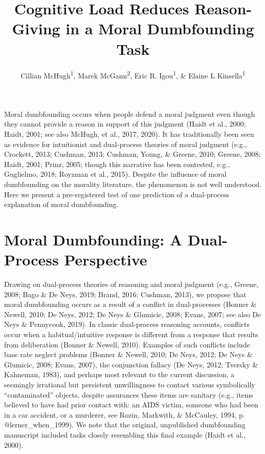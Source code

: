 \documentclass[
  american,
  man,floatsintext]{apa7}
\title{Cognitive Load Reduces Reason-Giving in a Moral Dumbfounding Task}
\author{Cillian McHugh\textsuperscript{1}, Marek McGann\textsuperscript{2}, Eric R. Igou\textsuperscript{1}, \& Elaine L Kinsella\textsuperscript{1}}
\date{}
\affiliation{\vspace{0.5cm}\textsuperscript{1} University of Limerick\\\textsuperscript{2} Mary Immaculate College \textasciitilde{} University of Limerick}
\begin{document}
\maketitle

Moral dumbfounding occurs when people defend a moral judgment even though they cannot provide a reason in support of this judgment (Haidt et al., 2000; Haidt, 2001; see also McHugh, et al., 2017, 2020). It has traditionally been seen as evidence for intuitionist and dual-process theories of moral judgment (e.g., Crockett, 2013; Cushman, 2013; Cushman, Young, \& Greene, 2010; Greene, 2008; Haidt, 2001; Prinz, 2005; though this narrative has been contested, e.g., Guglielmo, 2018; Royzman et al., 2015). Despite the influence of moral dumbfounding on the morality literature, the phenomenon is not well understood. Here we present a pre-registered test of one prediction of a dual-process explanation of moral dumbfounding.

\hypertarget{moral-dumbfounding-a-dual-process-perspective}{%
\section{Moral Dumbfounding: A Dual-Process Perspective}\label{moral-dumbfounding-a-dual-process-perspective}}

Drawing on dual-process theories of reasoning and moral judgment (e.g., Greene, 2008; Bago \& De Neys, 2019; Brand, 2016; Cushman, 2013), we propose that moral dumbfounding occurs as a result of a conflict in dual-processes (Bonner \& Newell, 2010; De Neys, 2012; De Neys \& Glumicic, 2008; Evans, 2007; see also De Neys \& Pennycook, 2019). In classic dual-process reasoning accounts, conflicts occur when a habitual/intuitive response is different from a response that results from deliberation (Bonner \& Newell, 2010). Examples of such conflicts include base rate neglect problems (Bonner \& Newell, 2010; De Neys, 2012; De Neys \& Glumicic, 2008; Evans, 2007), the conjunction fallacy (De Neys, 2012; Tversky \& Kahneman, 1983), and perhaps most relevant to the current discussion, a seemingly irrational but persistent unwillingness to contact various symbolically \enquote{contaminated} objects, despite assurances these items are sanitary (e.g., items believed to have had prior contact with: an AIDS victim, someone who had been in a car accident, or a murderer, see Rozin, Markwith, \& McCauley, 1994, p. @lerner\_when\_1999). We note that the original, unpublished dumbfounding manuscript included tasks closely resembling this final example (Haidt et al., 2000).
\end{document}
